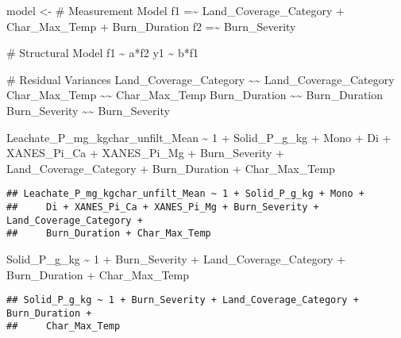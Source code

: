 \documentclass[
]{article}
\newenvironment{Shaded}{\begin{snugshade}}{\end{snugshade}}
\newcommand{\DecValTok}[1]{\textcolor[rgb]{0.00,0.00,0.81}{#1}}
\newcommand{\NormalTok}[1]{#1}
\newcommand{\OtherTok}[1]{\textcolor[rgb]{0.56,0.35,0.01}{#1}}
\newcommand{\SpecialCharTok}[1]{\textcolor[rgb]{0.00,0.00,0.00}{#1}}
\newcommand{\StringTok}[1]{\textcolor[rgb]{0.31,0.60,0.02}{#1}}
\begin{document}
\begin{Shaded}
\begin{Highlighting}[]
\NormalTok{model }\OtherTok{\textless{}{-}} \StringTok{\textquotesingle{}}
\StringTok{  \# Measurement Model}
\StringTok{    f1 =\textasciitilde{} Land\_Coverage\_Category + Char\_Max\_Temp + Burn\_Duration}
\StringTok{    f2 =\textasciitilde{} Burn\_Severity}

\StringTok{  \# Structural Model}
\StringTok{    f1 \textasciitilde{} a*f2}
\StringTok{    y1 \textasciitilde{} b*f1}

\StringTok{  \# Residual Variances}
\StringTok{    Land\_Coverage\_Category \textasciitilde{}\textasciitilde{} Land\_Coverage\_Category}
\StringTok{    Char\_Max\_Temp \textasciitilde{}\textasciitilde{} Char\_Max\_Temp}
\StringTok{    Burn\_Duration \textasciitilde{}\textasciitilde{} Burn\_Duration}
\StringTok{    Burn\_Severity \textasciitilde{}\textasciitilde{} Burn\_Severity}
\StringTok{\textquotesingle{}}

\NormalTok{Leachate\_P\_mg\_kgchar\_unfilt\_Mean }\SpecialCharTok{\textasciitilde{}} \DecValTok{1} \SpecialCharTok{+}\NormalTok{ Solid\_P\_g\_kg }\SpecialCharTok{+}\NormalTok{ Mono }\SpecialCharTok{+}\NormalTok{ Di }\SpecialCharTok{+}\NormalTok{ XANES\_Pi\_Ca }\SpecialCharTok{+}\NormalTok{ XANES\_Pi\_Mg }\SpecialCharTok{+}\NormalTok{ Burn\_Severity }\SpecialCharTok{+}\NormalTok{ Land\_Coverage\_Category }\SpecialCharTok{+}\NormalTok{ Burn\_Duration }\SpecialCharTok{+}\NormalTok{ Char\_Max\_Temp}
\end{Highlighting}
\end{Shaded}

\begin{verbatim}
## Leachate_P_mg_kgchar_unfilt_Mean ~ 1 + Solid_P_g_kg + Mono + 
##     Di + XANES_Pi_Ca + XANES_Pi_Mg + Burn_Severity + Land_Coverage_Category + 
##     Burn_Duration + Char_Max_Temp
\end{verbatim}

\begin{Shaded}
\begin{Highlighting}[]
\NormalTok{Solid\_P\_g\_kg }\SpecialCharTok{\textasciitilde{}} \DecValTok{1} \SpecialCharTok{+}\NormalTok{ Burn\_Severity }\SpecialCharTok{+}\NormalTok{ Land\_Coverage\_Category }\SpecialCharTok{+}\NormalTok{ Burn\_Duration }\SpecialCharTok{+}\NormalTok{ Char\_Max\_Temp}
\end{Highlighting}
\end{Shaded}

\begin{verbatim}
## Solid_P_g_kg ~ 1 + Burn_Severity + Land_Coverage_Category + Burn_Duration + 
##     Char_Max_Temp
\end{verbatim}
\end{document}
